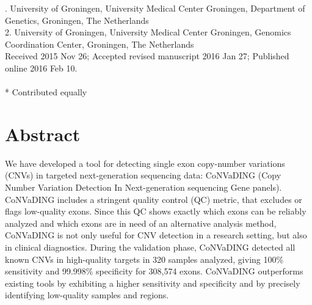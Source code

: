 . University of Groningen, University Medical Center Groningen, Department of Genetics, Groningen, The Netherlands\\
2. University of Groningen, University Medical Center Groningen, Genomics Coordination Center, Groningen, The Netherlands\\


\noindent
Received 2015 Nov 26; Accepted revised manuscript 2016 Jan 27; Published online 2016 Feb 10.
\\~\\
* Contributed equally


\section*{Abstract}\label{abstract}
We have developed a tool for detecting single exon copy-number variations (CNVs) in targeted next-generation sequencing data: CoNVaDING (Copy Number Variation Detection In Next-generation sequencing Gene panels).
CoNVaDING includes a stringent quality control (QC) metric, that excludes or flags low-quality exons. 
Since this QC shows exactly which exons can be reliably analyzed and which exons are in need of an alternative analysis method, CoNVaDING is not only useful for CNV detection in a research setting, but also in clinical diagnostics. 
During the validation phase, CoNVaDING detected all known CNVs in high-quality targets in 320 samples analyzed, giving 100\% sensitivity and 99.998\% specificity for 308,574 exons. 
CoNVaDING outperforms existing tools by exhibiting a higher sensitivity and specificity and by precisely identifying low-quality samples and regions. 

